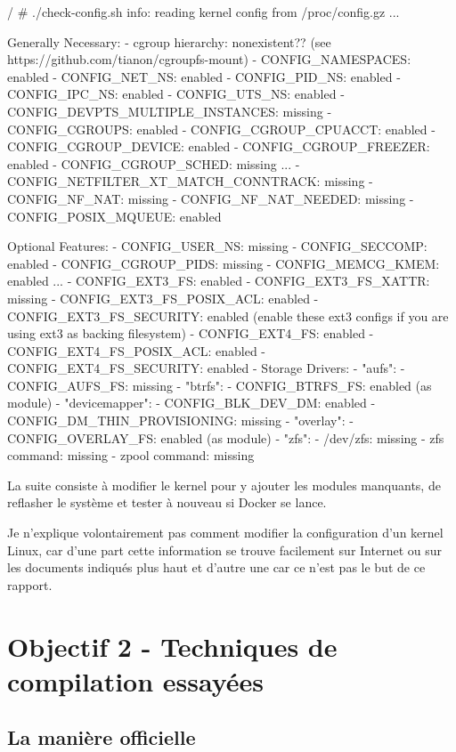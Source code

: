 \documentclass[11pt,a4paper,oneside]{report}
\begin{document}
\begin{bashcode}
/ # ./check-config.sh
info: reading kernel config from /proc/config.gz ...

Generally Necessary:
- cgroup hierarchy: nonexistent??
    (see https://github.com/tianon/cgroupfs-mount)
- CONFIG_NAMESPACES: enabled
- CONFIG_NET_NS: enabled
- CONFIG_PID_NS: enabled
- CONFIG_IPC_NS: enabled
- CONFIG_UTS_NS: enabled
- CONFIG_DEVPTS_MULTIPLE_INSTANCES: missing
- CONFIG_CGROUPS: enabled
- CONFIG_CGROUP_CPUACCT: enabled
- CONFIG_CGROUP_DEVICE: enabled
- CONFIG_CGROUP_FREEZER: enabled
- CONFIG_CGROUP_SCHED: missing
...
- CONFIG_NETFILTER_XT_MATCH_CONNTRACK: missing
- CONFIG_NF_NAT: missing
- CONFIG_NF_NAT_NEEDED: missing
- CONFIG_POSIX_MQUEUE: enabled

Optional Features:
- CONFIG_USER_NS: missing
- CONFIG_SECCOMP: enabled
- CONFIG_CGROUP_PIDS: missing
- CONFIG_MEMCG_KMEM: enabled
...
- CONFIG_EXT3_FS: enabled
- CONFIG_EXT3_FS_XATTR: missing
- CONFIG_EXT3_FS_POSIX_ACL: enabled
- CONFIG_EXT3_FS_SECURITY: enabled
    (enable these ext3 configs if you are using ext3 as backing filesystem)
- CONFIG_EXT4_FS: enabled
- CONFIG_EXT4_FS_POSIX_ACL: enabled
- CONFIG_EXT4_FS_SECURITY: enabled
- Storage Drivers:
  - "aufs":
    - CONFIG_AUFS_FS: missing
  - "btrfs":
    - CONFIG_BTRFS_FS: enabled (as module)
  - "devicemapper":
    - CONFIG_BLK_DEV_DM: enabled
    - CONFIG_DM_THIN_PROVISIONING: missing
  - "overlay":
    - CONFIG_OVERLAY_FS: enabled (as module)
  - "zfs":
    - /dev/zfs: missing
    - zfs command: missing
    - zpool command: missing
\end{bashcode}

La suite consiste à modifier le kernel pour y ajouter les modules manquants, de reflasher le système et tester à nouveau si Docker se lance.

Je n'explique volontairement pas comment modifier la configuration d'un kernel Linux, car d'une part cette information se trouve facilement sur Internet ou sur les documents indiqués plus haut et d'autre une car ce n'est pas le but de ce rapport.

\chapter{Objectif 2 - Techniques de compilation essayées}

\section{La manière officielle}\label{maniere_officielle}
\end{document}
